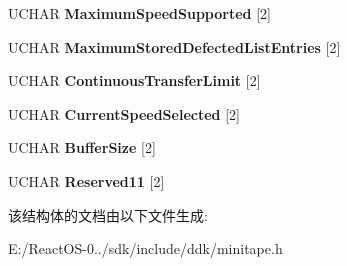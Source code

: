 \begin{DoxyCompactItemize}
\item 
\mbox{\label{struct___m_o_d_e___c_a_p_a_b_i_l_i_t_i_e_s___p_a_g_e_a8d4edb92892ab35c1a5b5a05d18f4e5c}} 
U\+C\+H\+AR {\bfseries Maximum\+Speed\+Supported} \mbox{[}2\mbox{]}
\item 
\mbox{\label{struct___m_o_d_e___c_a_p_a_b_i_l_i_t_i_e_s___p_a_g_e_a0d9404dcc00592283b51368d47287b0b}} 
U\+C\+H\+AR {\bfseries Maximum\+Stored\+Defected\+List\+Entries} \mbox{[}2\mbox{]}
\item 
\mbox{\label{struct___m_o_d_e___c_a_p_a_b_i_l_i_t_i_e_s___p_a_g_e_a606adf6d76a35299a5af4ea3ba90ce82}} 
U\+C\+H\+AR {\bfseries Continuous\+Transfer\+Limit} \mbox{[}2\mbox{]}
\item 
\mbox{\label{struct___m_o_d_e___c_a_p_a_b_i_l_i_t_i_e_s___p_a_g_e_aac958b01aeb0bfa9da5be258d36e8d63}} 
U\+C\+H\+AR {\bfseries Current\+Speed\+Selected} \mbox{[}2\mbox{]}
\item 
\mbox{\label{struct___m_o_d_e___c_a_p_a_b_i_l_i_t_i_e_s___p_a_g_e_a824d252c696bf7b84026b04e20687588}} 
U\+C\+H\+AR {\bfseries Buffer\+Size} \mbox{[}2\mbox{]}
\item 
\mbox{\label{struct___m_o_d_e___c_a_p_a_b_i_l_i_t_i_e_s___p_a_g_e_a91d1a34d94f0e70d01e8db37398679ac}} 
U\+C\+H\+AR {\bfseries Reserved11} \mbox{[}2\mbox{]}
\end{DoxyCompactItemize}


该结构体的文档由以下文件生成\+:\begin{DoxyCompactItemize}
\item 
E\+:/\+React\+O\+S-\/0../sdk/include/ddk/minitape.\+h\end{DoxyCompactItemize}
